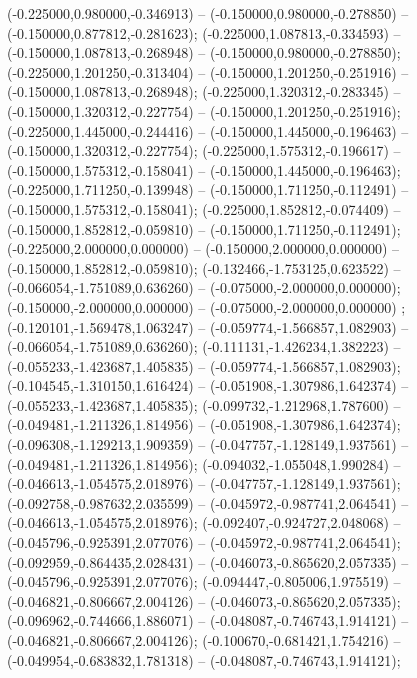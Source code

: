  (-0.225000,0.980000,-0.346913) -- (-0.150000,0.980000,-0.278850) -- (-0.150000,0.877812,-0.281623);
 (-0.225000,1.087813,-0.334593) -- (-0.150000,1.087813,-0.268948) -- (-0.150000,0.980000,-0.278850);
 (-0.225000,1.201250,-0.313404) -- (-0.150000,1.201250,-0.251916) -- (-0.150000,1.087813,-0.268948);
 (-0.225000,1.320312,-0.283345) -- (-0.150000,1.320312,-0.227754) -- (-0.150000,1.201250,-0.251916);
 (-0.225000,1.445000,-0.244416) -- (-0.150000,1.445000,-0.196463) -- (-0.150000,1.320312,-0.227754);
 (-0.225000,1.575312,-0.196617) -- (-0.150000,1.575312,-0.158041) -- (-0.150000,1.445000,-0.196463);
 (-0.225000,1.711250,-0.139948) -- (-0.150000,1.711250,-0.112491) -- (-0.150000,1.575312,-0.158041);
 (-0.225000,1.852812,-0.074409) -- (-0.150000,1.852812,-0.059810) -- (-0.150000,1.711250,-0.112491);
 (-0.225000,2.000000,0.000000) -- (-0.150000,2.000000,0.000000) -- (-0.150000,1.852812,-0.059810);
 (-0.132466,-1.753125,0.623522) -- (-0.066054,-1.751089,0.636260) -- (-0.075000,-2.000000,0.000000);
 (-0.150000,-2.000000,0.000000) -- (-0.075000,-2.000000,0.000000) ;
 (-0.120101,-1.569478,1.063247) -- (-0.059774,-1.566857,1.082903) -- (-0.066054,-1.751089,0.636260);
 (-0.111131,-1.426234,1.382223) -- (-0.055233,-1.423687,1.405835) -- (-0.059774,-1.566857,1.082903);
 (-0.104545,-1.310150,1.616424) -- (-0.051908,-1.307986,1.642374) -- (-0.055233,-1.423687,1.405835);
 (-0.099732,-1.212968,1.787600) -- (-0.049481,-1.211326,1.814956) -- (-0.051908,-1.307986,1.642374);
 (-0.096308,-1.129213,1.909359) -- (-0.047757,-1.128149,1.937561) -- (-0.049481,-1.211326,1.814956);
 (-0.094032,-1.055048,1.990284) -- (-0.046613,-1.054575,2.018976) -- (-0.047757,-1.128149,1.937561);
 (-0.092758,-0.987632,2.035599) -- (-0.045972,-0.987741,2.064541) -- (-0.046613,-1.054575,2.018976);
 (-0.092407,-0.924727,2.048068) -- (-0.045796,-0.925391,2.077076) -- (-0.045972,-0.987741,2.064541);
 (-0.092959,-0.864435,2.028431) -- (-0.046073,-0.865620,2.057335) -- (-0.045796,-0.925391,2.077076);
 (-0.094447,-0.805006,1.975519) -- (-0.046821,-0.806667,2.004126) -- (-0.046073,-0.865620,2.057335);
 (-0.096962,-0.744666,1.886071) -- (-0.048087,-0.746743,1.914121) -- (-0.046821,-0.806667,2.004126);
 (-0.100670,-0.681421,1.754216) -- (-0.049954,-0.683832,1.781318) -- (-0.048087,-0.746743,1.914121);
